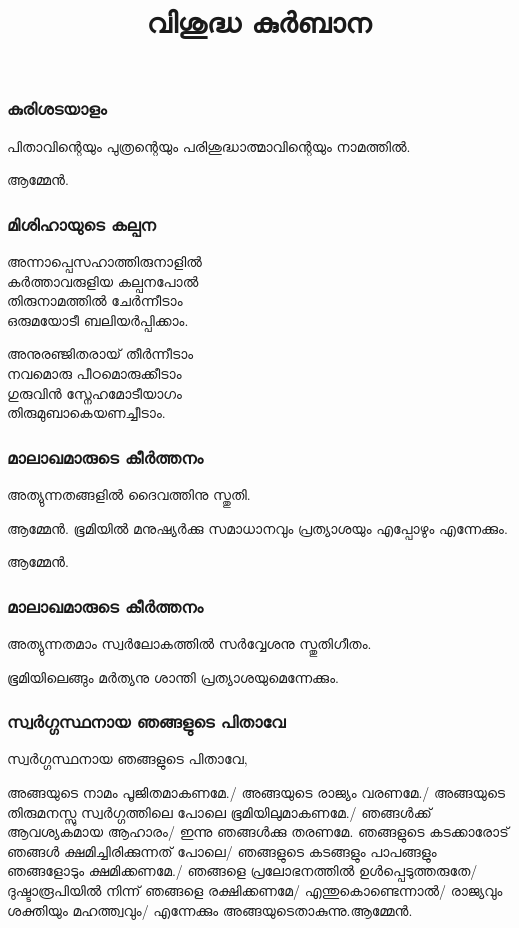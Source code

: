 \documentclass[20pt]{beamer}
\title{വിശുദ്ധ കുര്‍ബാന}
\newcommand{\Priest}[1]{\color{white}#1}
\newcommand{\People}[1]{\color{yellow}#1}
\newcommand{\Ammen}{\People{ആമ്മേന്‍.}}
\begin{document}
\begin{frame}
\frametitle{കുരിശടയാളം}
\Priest{
പിതാവിന്റെയും പുത്രന്റെയും പരിശുദ്ധാത്മാവിന്റെയും നാമത്തില്‍.
}
\bigbreak
\Ammen
\end{frame}

\begin{frame}
\frametitle{മിശിഹായുടെ കല്പന}
\Priest{
അന്നാപ്പെസഹാത്തിരുനാളില്‍\\
കര്‍ത്താവരുളിയ കല്പനപോല്‍\\
തിരുനാമത്തില്‍ ചേര്‍ന്നീടാം\\
ഒരുമയോടീ ബലിയര്‍പ്പിക്കാം.
}
\bigbreak
\People{
അനുരഞ്ജിതരായ് തീര്‍ന്നീടാം\\
നവമൊരു പീഠമൊരുക്കീടാം\\
ഗുരുവിന്‍ സ്നേഹമോടീയാഗം\\
തിരുമുബാകെയണച്ചീടാം.
}
\end{frame}

\begin{frame}
\frametitle{മാലാഖമാരുടെ കീര്‍ത്തനം}
\Priest{
അത്യുന്നതങ്ങളില്‍ ദൈവത്തിനു സ്തുതി.
}
\bigbreak
\Ammen
\bigbreak
\Priest{
ഭൂമിയില്‍ മനുഷ്യർക്കു സമാധാനവും പ്രത്യാശയും എപ്പോഴും എന്നേക്കും.
}
\bigbreak
\Ammen
\end{frame}

\begin{frame}
\frametitle{മാലാഖമാരുടെ കീര്‍ത്തനം}
\Priest{
അത്യുന്നതമാം സ്വര്‍ലോകത്തില്‍ സര്‍വ്വേശനു സ്തുതിഗീതം.
}
\bigbreak
\People{
ഭൂമിയിലെങ്ങും മര്‍ത്യനു ശാന്തി പ്രത്യാശയുമെന്നേക്കും.
}
\end{frame}

\begin{frame}[allowframebreaks]
\frametitle{സ്വര്‍ഗ്ഗസ്ഥനായ ഞങ്ങളുടെ പിതാവേ}
\Priest{
സ്വർഗ്ഗസ്ഥനായ ഞങ്ങളുടെ പിതാവേ,
}
\People{
അങ്ങയുടെ നാമം പൂജിതമാകണമേ./ അങ്ങയുടെ രാജ്യം വരണമേ./
അങ്ങയുടെ തിരുമനസ്സു സ്വര്‍ഗ്ഗത്തിലെ പോലെ ഭൂമിയിലുമാകണമേ./
ഞങ്ങള്‍ക്ക് ആവശ്യകമായ ആഹാരം/ ഇന്നു ഞങ്ങള്‍ക്കു തരണമേ.
ഞങ്ങളുടെ കടക്കാരോട് ഞങ്ങള്‍ ക്ഷമിച്ചിരിക്കുന്നത് പോലെ/
ഞങ്ങളുടെ കടങ്ങളും പാപങ്ങളും ഞങ്ങളോടും ക്ഷമിക്കണമേ./
ഞങ്ങളെ പ്രലോഭനത്തില്‍ ഉള്‍പ്പെടുത്തരുതേ/ ദുഷ്ടാരൂപിയില്‍ 
നിന്ന് ഞങ്ങളെ രക്ഷിക്കണമേ/ എന്തുകൊണ്ടെന്നാല്‍/ രാജ്യവും
ശക്തിയും മഹത്ത്വവും/ എന്നേക്കും അങ്ങയുടെതാകുന്നു.\bigbreak ആമ്മേന്‍.
}
\end{frame}
\end{document}
